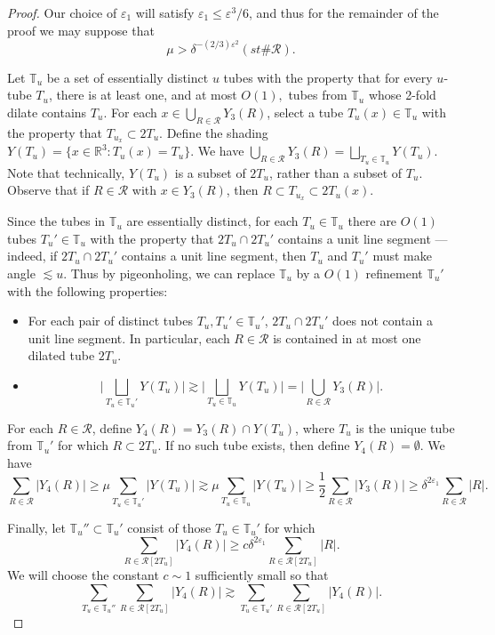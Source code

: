 \documentclass[letterpaper, reqno,11pt]{article}
\numberwithin{equation}{section}
\newcommand{\RR}{\mathbb{R}}
\newcommand{\eps}{\varepsilon}
\newcommand{\tubes}{\mathbb{T}}
\numberwithin{thm}{section}
\theoremstyle{remark}
\begin{document}
\begin{proof}
Our choice of $\eps_1$ will satisfy $\eps_1\leq\eps^3/6$, and thus for the remainder of the proof we may suppose that
\begin{equation}\label{muFairlyLarge}
\mu>\delta^{-(2/3)\eps^2}(st\#\mathcal{R}).
\end{equation}

\medskip
{} 
Let $\tubes_u$ be a set of essentially distinct $u$ tubes with the property that for every $u$-tube $T_u$, there is at least one, and at most $O(1),$ tubes from $\tubes_u$ whose 2-fold dilate contains $T_u$. 
%
For each $x\in\bigcup_{R\in\mathcal{R}}Y_3(R)$, select a tube $T_u(x)\in\tubes_u$ with the property that $T_{u_x}\subset 2T_u$. Define the shading $Y(T_u) = \{x\in\RR^3\colon T_u(x) = T_u\}$. We have $\bigcup_{R\in\mathcal{R}}Y_3(R)=\bigsqcup_{T_u\in\tubes_u}Y(T_u)$. Note that technically, $Y(T_u)$ is a subset of $2T_u$, rather than a subset of $T_u$. Observe that if $R\in\mathcal{R}$ with $x\in Y_3(R)$, then $R\subset T_{u_x}\subset 2T_u(x)$.


Since the tubes in $\tubes_u$ are essentially distinct, for each $T_u\in\tubes_u$ there are $O(1)$ tubes $T_u'\in \tubes_u$ with the property that $2T_u\cap 2T_u'$ contains a unit line segment --- indeed, if $2T_u\cap 2T_u'$ contains a unit line segment, then $T_u$ and $T_u'$ must make angle $\lesssim u$. Thus by pigeonholing, we can replace $\tubes_u$ by a $O(1)$ refinement $\tubes_u'$ with the following properties:
\begin{itemize}
\item For each pair of distinct tubes $T_u,T_u'\in\tubes_u'$, $2T_u\cap 2T_u'$ does not contain a unit line segment. In particular, each $R\in\mathcal{R}$ is contained in at most one dilated tube $2T_u$.

\item
\[
\Big|\bigsqcup_{T_u\in\tubes_u'}Y(T_u)\Big|\gtrsim \Big|\bigsqcup_{T_u\in\tubes_u}Y(T_u)\Big| = \Big|\bigcup_{R\in\mathcal{R}}Y_3(R)\Big|.
\]
\end{itemize}

For each $R\in\mathcal{R}$, define $Y_4(R) = Y_3(R) \cap Y(T_u)$, where $T_u$ is the unique tube from $\tubes_u'$ for which $R\subset 2T_u$. If no such tube exists, then define $Y_4(R) = \emptyset$. We have
\[
\sum_{R\in\mathcal{R}}|Y_4(R)|\geq \mu \sum_{T_u\in\tubes_u'}|Y(T_u)|\gtrsim  \mu \sum_{T_u\in\tubes_u}|Y(T_u)|\geq\frac{1}{2}\sum_{R\in\mathcal{R}}|Y_3(R)|\geq \delta^{2\eps_1}\sum_{R\in\mathcal{R}}|R|.
\]

Finally, let $\tubes_u''\subset\tubes_u'$ consist of those $T_u\in\tubes_u'$ for which
\begin{equation}\label{keepcDelta2eps1Fraction}
\sum_{R\in\mathcal{R}[2T_u]}|Y_4(R)| \geq c\delta^{2\eps_1} \sum_{R\in\mathcal{R}[2T_u]}|R|.
\end{equation}
We will choose the constant $c\sim 1$ sufficiently small so that 
\[
\sum_{T_u\in\tubes_u''}\sum_{R\in\mathcal{R}[2T_u]}|Y_4(R)|\gtrsim \sum_{T_u\in\tubes_u'}\sum_{R\in\mathcal{R}[2T_u]}|Y_4(R)|.
\]



\end{proof}
\end{document}

